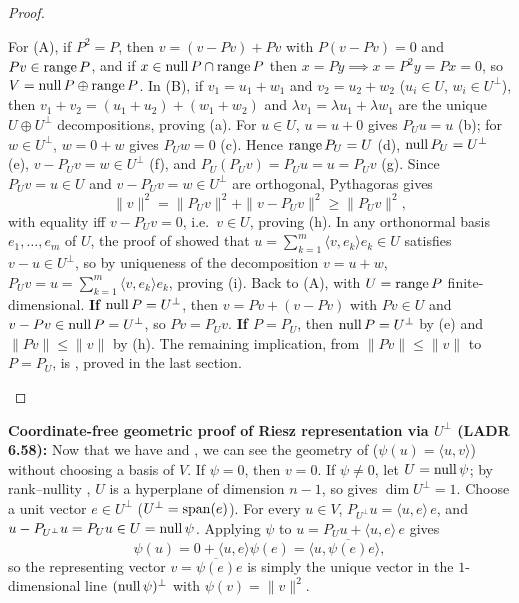 \documentclass[10pt]{scrartcl}
\newcommand{\ip}[2]{\langle #1,#2\rangle}
\begin{document}
\begin{proof}
  \begin{steps}
    \ii For (A), if $P^2=P$, then $v=(v-Pv)+Pv$ with $P(v-Pv)=0$ and $Pv\in\operatorname{range} P$, and if $x\in\operatorname{null} P\cap\operatorname{range} P$ then $x=Py\implies x=P^2y=Px=0$, so $V=\operatorname{null} P\oplus\operatorname{range} P$.
    \ii In (B), if $v_1=u_1+w_1$ and $v_2=u_2+w_2$ ($u_i\in U$, $w_i\in U^\perp$), then $v_1+v_2=(u_1+u_2)+(w_1+w_2)$ and $\lambda v_1=\lambda u_1+\lambda w_1$ are the unique $U\oplus U^\perp$ decompositions, proving (a).
    \ii For $u\in U$, $u=u+0$ gives $P_U u=u$ (b); for $w\in U^\perp$, $w=0+w$ gives $P_U w=0$ (c). Hence $\operatorname{range} P_U=U$ (d), $\operatorname{null} P_U=U^\perp$ (e), $v-P_U v=w\in U^\perp$ (f), and $P_U(P_U v)=P_U u=u=P_U v$ (g).
    \ii Since $P_U v=u\in U$ and $v-P_U v=w\in U^\perp$ are orthogonal, Pythagoras gives
    \[ \|v\|^2=\|P_U v\|^2+\|v-P_U v\|^2\ge\|P_U v\|^2, \]
    with equality iff $v-P_U v=0$, i.e.\ $v\in U$, proving (h).
    \ii In any orthonormal basis $e_1,\dots,e_m$ of $U$, the proof of  showed that $u=\sum_{k=1}^m\ip v{e_k}e_k\in U$ satisfies $v-u\in U^\perp$, so by uniqueness of the decomposition $v=u+w$, $P_U v=u=\sum_{k=1}^m\ip v{e_k}e_k$, proving (i).
    \ii Back to (A), with $U=\operatorname{range} P$ finite-dimensional. \textbf{If $\operatorname{null} P=U^\perp$}, then $v=Pv+(v-Pv)$ with $Pv\in U$ and $v-Pv\in\operatorname{null} P=U^\perp$, so $Pv=P_Uv$. \textbf{If $P=P_U$}, then $\operatorname{null} P=U^\perp$ by (e) and $\|Pv\|\le\|v\|$ by (h). The remaining implication, from $\|Pv\|\le\|v\|$ to $P=P_U$, is , proved in the last section.
  \end{steps}
\end{proof}

\begin{itemize}
  \ii \textbf{Coordinate-free geometric proof of Riesz representation via $U^\perp$ (LADR 6.58):} Now that we have  and , we can see the geometry of  ($\psi(u)=\ip uv$) without choosing a basis of $V$. If $\psi=0$, then $v=0$. If $\psi\ne 0$, let $U=\operatorname{null}\psi$; by rank--nullity , $U$ is a hyperplane of dimension $n-1$, so  gives $\dim U^\perp=1$. Choose a unit vector $e\in U^\perp$ ($U^\perp=\operatorname{span}(e)$). For every $u\in V$, $P_{U^\perp}u=\ip ue\,e$, and $u-P_{U^\perp}u=P_U u\in U=\operatorname{null}\psi$. Applying $\psi$ to $u=P_U u+\ip ue\,e$ gives
  \[
    \psi(u) = 0 + \ip ue\psi(e) = \ip{u}{\overline{\psi(e)}e},
  \]
  so the representing vector $v=\overline{\psi(e)}e$ is simply the unique vector in the $1$-dimensional line $(\operatorname{null}\psi)^\perp$ with $\psi(v)=\|v\|^2$.
\end{itemize}
\end{document}
